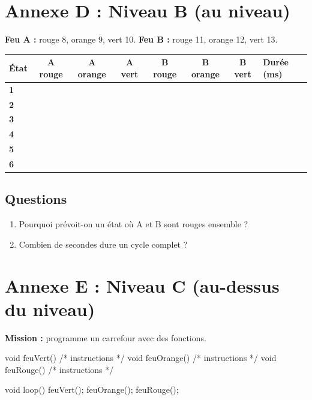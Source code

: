 \documentclass[11pt,a4paper]{article}
\begin{document}
\newpage
\section*{Annexe D : Niveau B (au niveau)}

\textbf{Feu A :} rouge 8, orange 9, vert 10. \textbf{Feu B :} rouge 11, orange 12, vert 13.

\begin{tabularx}{\linewidth}{>{\bfseries}p{1.4cm}c c c c c c Y}
\toprule
État & A rouge & A orange & A vert & B rouge & B orange & B vert & Durée (ms)\\
 & & & & & & & \\ 2 & & & & & & & \\ 3 & & & & & & & \\ 4 & & & & & & & \\ 5 & & & & & & & \\ 6 & & & & & & & \\
\bottomrule
\end{tabularx}

\subsection*{Questions}
\begin{enumerate}
 \item Pourquoi prévoit-on un état où A et B sont rouges ensemble ? \dotfill
 \item Combien de secondes dure un cycle complet ? \dotfill
\end{enumerate}

\newpage
\section*{Annexe E : Niveau C (au-dessus du niveau)}

\textbf{Mission :} programme un carrefour avec des fonctions.

\begin{arduino}
void feuVert()   { /* instructions */ }
void feuOrange() { /* instructions */ }
void feuRouge()  { /* instructions */ }

void loop() {
  feuVert();
  feuOrange();
  feuRouge();
}
\end{arduino}
\end{document}
